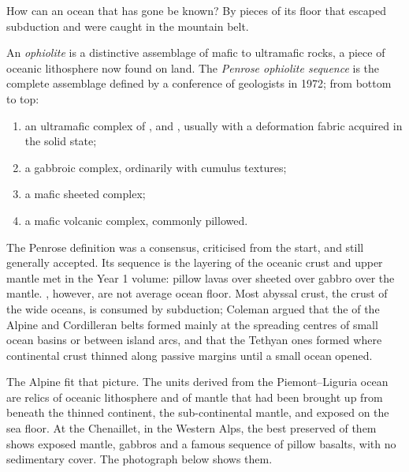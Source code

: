 How can an ocean that has gone be known? By pieces of its floor that escaped
subduction and were caught in the mountain belt.

\begin{definition}\label{def:b2:alpine-orogen:ophiolite}
An \emph{ophiolite} is a distinctive assemblage of mafic to ultramafic
rocks, a piece of oceanic lithosphere now found on land. The \emph{Penrose ophiolite
sequence} is the complete assemblage defined by a
conference of geologists in 1972; from bottom to top:
\begin{enumerate}
\item an ultramafic complex of ,  and , usually with a
deformation fabric acquired in the solid state;
\item a gabbroic complex, ordinarily with cumulus textures;
\item a mafic sheeted  complex;
\item a mafic volcanic complex, commonly pillowed.
\end{enumerate}
\end{definition}

The Penrose definition was a consensus, criticised from the start, and still generally
accepted. Its sequence is the layering of the oceanic crust and upper mantle met in the Year 1
volume: pillow lavas over sheeted  over gabbro over the mantle. , however, are not
average ocean floor. Most abyssal crust, the crust of the wide oceans, is consumed by
subduction; Coleman argued that the  of the Alpine and Cordilleran belts formed
mainly at the spreading centres of small ocean basins or between island arcs, and that the
Tethyan ones formed where continental crust thinned along passive margins until a small
ocean opened.

The Alpine  fit that picture. The units derived from the Piemont--Liguria ocean
are relics of oceanic lithosphere and of mantle that had been brought up from beneath the
thinned continent, the sub-continental mantle, and exposed on the sea floor. At the
Chenaillet, in the Western Alps, the best preserved of them shows exposed
mantle, gabbros and a famous sequence of pillow basalts, with no sedimentary cover.
The photograph below shows them.

